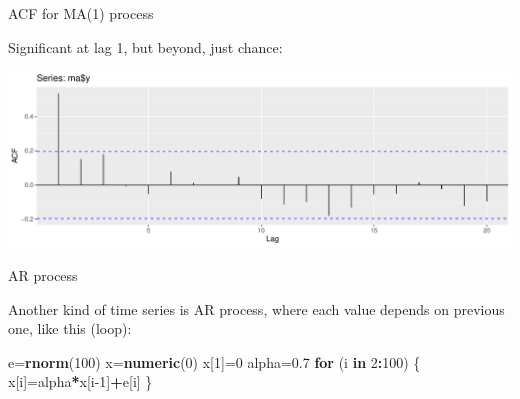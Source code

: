 \documentclass[
  ignorenonframetext,
]{beamer}
\newenvironment{Shaded}{\begin{snugshade}}{\end{snugshade}}
\newcommand{\ControlFlowTok}[1]{\textcolor[rgb]{0.13,0.29,0.53}{\textbf{#1}}}
\newcommand{\DataTypeTok}[1]{\textcolor[rgb]{0.13,0.29,0.53}{#1}}
\newcommand{\DecValTok}[1]{\textcolor[rgb]{0.00,0.00,0.81}{#1}}
\newcommand{\FloatTok}[1]{\textcolor[rgb]{0.00,0.00,0.81}{#1}}
\newcommand{\KeywordTok}[1]{\textcolor[rgb]{0.13,0.29,0.53}{\textbf{#1}}}
\newcommand{\NormalTok}[1]{#1}
\newcommand{\OperatorTok}[1]{\textcolor[rgb]{0.81,0.36,0.00}{\textbf{#1}}}
\newcommand{\StringTok}[1]{\textcolor[rgb]{0.31,0.60,0.02}{#1}}
\begin{document}
\begin{frame}[fragile]{ACF for MA(1) process}
\protect\hypertarget{acf-for-ma1-process}{}

Significant at lag 1, but beyond, just chance:

\begin{Shaded}
\end{Shaded}

\includegraphics{slides_d29_files/figure-beamer/unnamed-chunk-555-1.pdf}

\end{frame}

\begin{frame}[fragile]{AR process}
\protect\hypertarget{ar-process}{}

Another kind of time series is AR process, where each value depends on
previous one, like this (loop):

\begin{Shaded}
\begin{Highlighting}[]
\NormalTok{e=}\KeywordTok{rnorm}\NormalTok{(}\DecValTok{100}\NormalTok{)}
\NormalTok{x=}\KeywordTok{numeric}\NormalTok{(}\DecValTok{0}\NormalTok{)}
\NormalTok{x[}\DecValTok{1}\NormalTok{]=}\DecValTok{0}
\NormalTok{alpha=}\FloatTok{0.7}
\ControlFlowTok{for}\NormalTok{ (i }\ControlFlowTok{in} \DecValTok{2}\OperatorTok{:}\DecValTok{100}\NormalTok{)}
\NormalTok{\{}
\NormalTok{  x[i]=alpha}\OperatorTok{*}\NormalTok{x[i}\DecValTok{-1}\NormalTok{]}\OperatorTok{+}\NormalTok{e[i]}
\NormalTok{\}}
\end{Highlighting}
\end{Shaded}

\end{frame}
\end{document}
